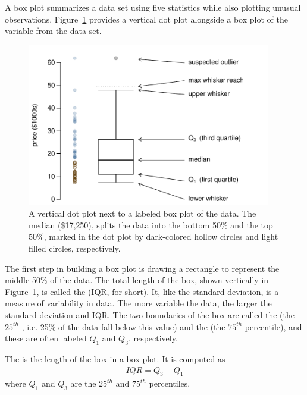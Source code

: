 A box plot summarizes a data set using five statistics while also plotting unusual observations. Figure~\ref{boxPlotLayout} provides a vertical dot plot alongside a box plot of the  variable from the  data set.
\begin{figure}[h]
   \centering
   \includegraphics[height=2.8in]{01/figures/boxPlotLayout/boxPlotLayout}
   \caption{A vertical dot plot next to a labeled box plot of the  data. The median (\$17,250), splits the data into the bottom 50\% and the top 50\%, marked in the dot plot by dark-colored hollow circles and light filled circles, respectively.}
   \label{boxPlotLayout}
\end{figure}

The first step in building a box plot is drawing a rectangle to represent the middle 50\% of the data. The total length of the box, shown vertically in Figure~\ref{boxPlotLayout}, is called the  (IQR, for short). It, like the standard deviation, is a measure of variability in data. The more variable the data, the larger the standard deviation and IQR. The two boundaries of the box are called the  (the $25^{th}$ , i.e. 25\% of the data fall below this value) and the  (the $75^{th}$ percentile), and these are often labeled $Q_1$ and $Q_3$, respectively.

\begin{termBox}{
The  is the length of the box in a box plot. It is computed as
\begin{eqnarray*}
IQR = Q_3 - Q_1
\end{eqnarray*}
where $Q_1$ and $Q_3$ are the $25^{th}$ and $75^{th}$ percentiles.}
\end{termBox}

